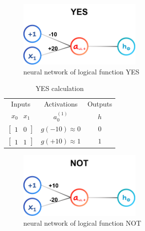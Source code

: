 \begin{itemize}
    \begin{figure}[H]
        \centering
        \includegraphics[width=2.4in]{./images/logicGate_YES.png}
        \caption{neural network of logical function YES}
    \end{figure}

    \begin{table}[H]
        \renewcommand\arraystretch{1.5}
        \caption{YES calculation}
        \centering
        \begin{tabular}{ccc}
            \hline\hline %
            Inputs                                                 & Activations        & Outputs    \\ 
            $\begin{array}{ccc} x_0 & x_1 \end{array}$             & $a^{(1)}_0$        & $h$        \\ 
            \hline %
            $\left[{\begin{array}{ccc} 1 & 0 \end{array}}\right]$  & $g(-10) \approx 0$ & $0$        \\
            $\left[{\begin{array}{ccc} 1 & 1 \end{array}}\right]$  & $g(+10) \approx 1$ & $1$        \\[1ex]
            \hline\hline %
        \end{tabular}
    \end{table}
    
    \begin{figure}[H]
        \centering
        \includegraphics[width=2.4in]{./images/logicGate_NOT.png}
        \caption{neural network of logical function NOT}
    \end{figure}


\end{itemize}
